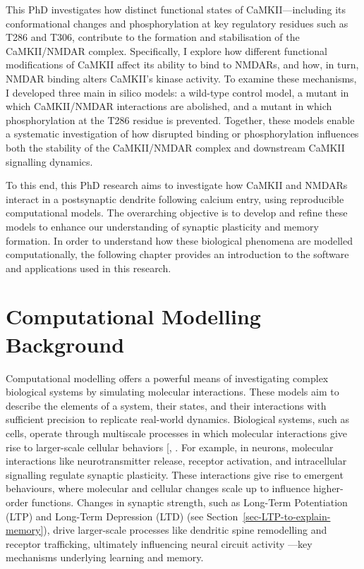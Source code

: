 \documentclass[
  11pt,
  letterpaper,
]{scrreprt}
\begin{document}
This PhD investigates how distinct functional states of
CaMKII---including its conformational changes and phosphorylation at key
regulatory residues such as T286 and T306, contribute to the formation
and stabilisation of the CaMKII/NMDAR complex. Specifically, I explore
how different functional modifications of CaMKII affect its ability to
bind to NMDARs, and how, in turn, NMDAR binding alters CaMKII's kinase
activity. To examine these mechanisms, I developed three main in silico
models: a wild-type control model, a mutant in which CaMKII/NMDAR
interactions are abolished, and a mutant in which phosphorylation at the
T286 residue is prevented. Together, these models enable a systematic
investigation of how disrupted binding or phosphorylation influences
both the stability of the CaMKII/NMDAR complex and downstream CaMKII
signalling dynamics.

To this end, this PhD research aims to investigate how CaMKII and NMDARs
interact in a postsynaptic dendrite following calcium entry, using
reproducible computational models. The overarching objective is to
develop and refine these models to enhance our understanding of synaptic
plasticity and memory formation. In order to understand how these
biological phenomena are modelled computationally, the following chapter
provides an introduction to the software and applications used in this
research.


\chapter{Computational Modelling Background}\label{sec-intro-comp}

Computational modelling offers a powerful means of investigating complex
biological systems by simulating molecular interactions. These models
aim to describe the elements of a system, their states, and their
interactions with sufficient precision to replicate real-world dynamics.
Biological systems, such as cells, operate through multiscale processes
in which molecular interactions give rise to larger-scale cellular
behaviors {[},
\citeproc{ref-suki2011Complexity}{238}{]}. For example, in neurons,
molecular interactions like neurotransmitter release, receptor
activation, and intracellular signalling regulate synaptic plasticity.
These interactions give rise to emergent behaviours, where molecular and
cellular changes scale up to influence higher-order functions. Changes
in synaptic strength, such as Long-Term Potentiation (LTP) and Long-Term
Depression (LTD) (see Section~\ref{sec-LTP-to-explain-memory}), drive
larger-scale processes like dendritic spine remodelling and receptor
trafficking, ultimately influencing neural circuit activity ---key
mechanisms underlying learning and memory.
\end{document}
